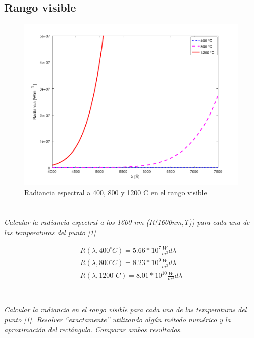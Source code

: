 \documentclass[12pt,a4paper]{article}
\begin{document}
		\subsection{Rango visible}
			\begin{figure}[H]
					\centering\includegraphics[scale=1]{images/visible.pdf}\caption{Radiancia espectral a 400, 800 y 1200 \textdegree C en el rango visible}
			\end{figure}

	\section{}
		\textit{
		Calcular la radiancia espectral a los 1600 nm (R(1600nm,T)) para cada una de las
		temperaturas del punto \ref{1}
		}

		\begin{align*}
			R(\lambda, 400 ^{\circ}C) = 5.66 * 10^7 \frac{W}{m^3} d\lambda \\
			R(\lambda, 800 ^{\circ}C) = 8.23 * 10^9 \frac{W}{m^3} d\lambda \\
			R(\lambda, 1200 ^{\circ}C) = 8.01 * 10^{10} \frac{W}{m^3} d\lambda \\
		\end{align*}

	\section{}
		\textit{Calcular la radiancia en el rango visible para cada una de las temperaturas del punto
		\ref{1}. Resolver “exactamente” utilizando algún método numérico y la aproximación del
		rectángulo. Comparar ambos resultados.
		}
		\\
\end{document}
